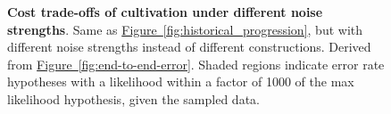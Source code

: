 \documentclass[onecolumn,unpublished,a4paper]{quantumarticle}
\theoremstyle{definition}
\newcommand{\fig}[1]{\hyperref[fig:#1]{Figure~\ref*{fig:#1}}}
\begin{document}
\begin{figure}
    \begin{adjustwidth}{-2.5cm}{-2.5cm}
    \end{adjustwidth}
    \caption{
        \textbf{Cost trade-offs of cultivation under different noise strengths}.
        Same as \fig{historical_progression}, but with different noise strengths instead of different constructions.
        Derived from \fig{end-to-end-error}.
        Shaded regions indicate error rate hypotheses with a likelihood within a factor of 1000 of the max likelihood hypothesis, given the sampled data.
    }
    \label{fig:future-comparison}
\end{figure}
\end{document}
